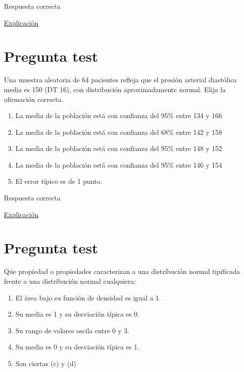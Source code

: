 \documentclass[
]{book}
\providecommand{\tightlist}{%
  \setlength{\itemsep}{0pt}\setlength{\parskip}{0pt}}
\begin{document}
Respuesta correcta

\href{https://homepage.divms.uiowa.edu/~mbognar/}{Explicación}

\hypertarget{pregunta-test-96}{%
\section{Pregunta test}\label{pregunta-test-96}}

Una muestra aleatoria de 64 pacientes refleja que el presión arterial diastólica media es 150 (DT 16), con distribución aproximadamente normal. Elija la afirmación correcta.

\begin{enumerate}
\def\labelenumi{\alph{enumi})}
\tightlist
\item
  La media de la población está con confianza del 95\% entre 134 y 166
\item
  La media de la población está con confianza del 68\% entre 142 y 158
\item
  La media de la población está con confianza del 95\% entre 148 y 152
\item
  La media de la población está con confianza del 95\% entre 146 y 154
\item
  El error típico es de 1 punto.
\end{enumerate}

Respuesta correcta

\href{https://homepage.divms.uiowa.edu/~mbognar/}{Explicación}

\hypertarget{pregunta-test-97}{%
\section{Pregunta test}\label{pregunta-test-97}}

Qúe propiedad o propiedades caracterizan a una distribución normal tipificada frente a una distribución normal cualquiera:

\begin{enumerate}
\def\labelenumi{\alph{enumi})}
\tightlist
\item
  El área bajo su función de densidad es igual a 1.
\item
  Su media es 1 y su desviación típica es 0.
\item
  Su rango de valores oscila entre 0 y 3.
\item
  Su media es 0 y su desviación típica es 1.
\item
  Son ciertas (c) y (d)
\end{enumerate}
\end{document}
